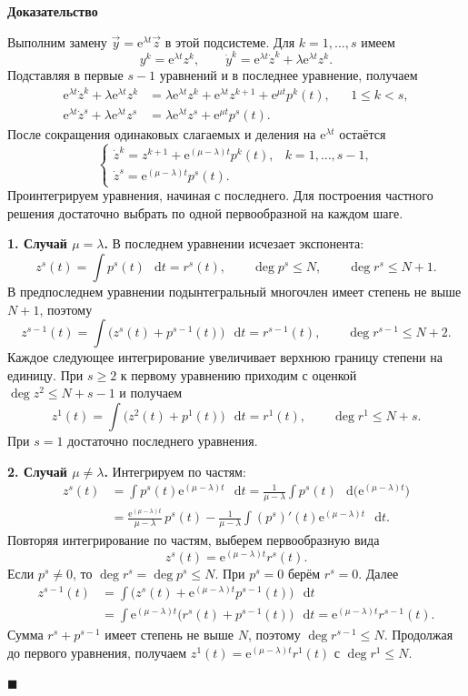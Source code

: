 \documentclass[12pt,a4paper]{article}
\numberwithin{equation}{section}
\newcommand{\vect}[1]{\vec{#1}}
\newcommand{\e}{\mathrm{e}}
\newcommand{\dd}{\mathop{}\!\mathrm{d}}
\renewenvironment{proof}[1][Доказательство]{\begin{center}\textbf{#1}\end{center}}{\hfill$\blacksquare$\par}
\begin{document}
\begin{proof}
Выполним замену $\vect y=\e^{\lambda t}\vect z$ в этой подсистеме.
Для $k=1,\ldots,s$ имеем
\[
 y^k=\e^{\lambda t}z^k,\qquad
 \dot y^k=\e^{\lambda t}\dot z^k+\lambda\e^{\lambda t}z^k.
\]
Подставляя в первые $s-1$ уравнений и в последнее уравнение, получаем
\[
 \begin{aligned}
 \e^{\lambda t}\dot z^k+\lambda\e^{\lambda t}z^k
 &=\lambda\e^{\lambda t}z^k+\e^{\lambda t}z^{k+1}+\e^{\mu t}p^k(t),
 &&1\le k<s,\\
 \e^{\lambda t}\dot z^s+\lambda\e^{\lambda t}z^s
 &=\lambda\e^{\lambda t}z^s+\e^{\mu t}p^s(t).
 \end{aligned}
\]
После сокращения одинаковых слагаемых и деления на $\e^{\lambda t}$ остаётся
\[
 \begin{cases}
 \dot z^k=z^{k+1}+\e^{(\mu-\lambda)t}p^k(t),& k=1,\ldots,s-1,\\
 \dot z^s=\e^{(\mu-\lambda)t}p^s(t).
 \end{cases}
\]
Проинтегрируем уравнения, начиная с последнего. Для построения частного
решения достаточно выбрать по одной первообразной на каждом шаге.

\smallskip
\noindent\textbf{1. Случай $\mu=\lambda$.}
В последнем уравнении исчезает экспонента:
\[
 z^s(t)=\int p^s(t)\,\dd t=r^s(t),\qquad
 \deg p^s\le N,\qquad \deg r^s\le N+1.
\]
В предпоследнем уравнении подынтегральный многочлен имеет степень не выше
$N+1$, поэтому
\[
 z^{s-1}(t)=\int\bigl(z^s(t)+p^{s-1}(t)\bigr)\,\dd t=r^{s-1}(t),
 \qquad\deg r^{s-1}\le N+2.
\]
Каждое следующее интегрирование увеличивает верхнюю границу степени
на единицу. При $s\ge2$ к первому уравнению приходим с оценкой
$\deg z^2\le N+s-1$ и получаем
\[
 z^1(t)=\int\bigl(z^2(t)+p^1(t)\bigr)\,\dd t=r^1(t),
 \qquad \deg r^1\le N+s.
\]
При $s=1$ достаточно последнего уравнения.

\smallskip
\noindent\textbf{2. Случай $\mu\ne\lambda$.}
Интегрируем по частям:
\[
 \begin{aligned}
 z^s(t)
 &=\int p^s(t)\e^{(\mu-\lambda)t}\,\dd t
   =\frac{1}{\mu-\lambda}\int p^s(t)\,\dd\bigl(\e^{(\mu-\lambda)t}\bigr)\\
 &=\frac{\e^{(\mu-\lambda)t}}{\mu-\lambda}\,p^s(t)
   -\frac{1}{\mu-\lambda}\int (p^s)'(t)\e^{(\mu-\lambda)t}\,\dd t .
 \end{aligned}
\]
Повторяя интегрирование по частям, выберем первообразную вида
\[
 z^s(t)=\e^{(\mu-\lambda)t}r^s(t).
\]
Если $p^s\ne0$, то $\deg r^s=\deg p^s\le N$. При $p^s=0$ берём $r^s=0$.
Далее
\[
 \begin{aligned}
 z^{s-1}(t)
 &=\int \bigl(z^s(t)+\e^{(\mu-\lambda)t}p^{s-1}(t)\bigr)\,\dd t\\
 &=\int \e^{(\mu-\lambda)t}\bigl(r^s(t)+p^{s-1}(t)\bigr)\,\dd t
   =\e^{(\mu-\lambda)t}r^{s-1}(t).
 \end{aligned}
\]
Сумма $r^s+p^{s-1}$ имеет степень не выше $N$, поэтому
$\deg r^{s-1}\le N$. Продолжая до первого уравнения, получаем
$z^1(t)=\e^{(\mu-\lambda)t}r^1(t)$ с $\deg r^1\le N$.


\end{proof}
\end{document}
